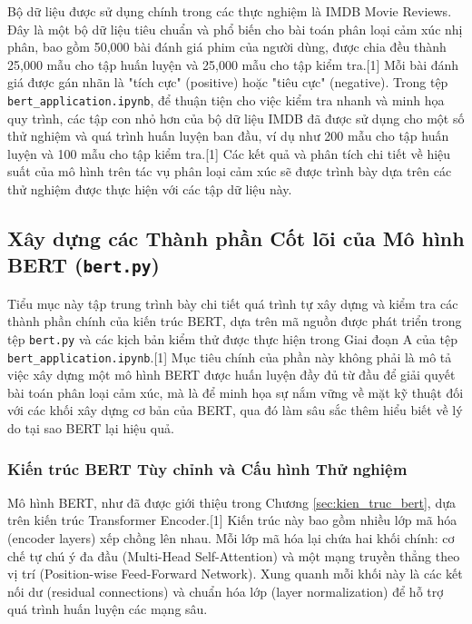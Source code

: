 Bộ dữ liệu được sử dụng chính trong các thực nghiệm là IMDB Movie Reviews. Đây là một bộ dữ liệu tiêu chuẩn và phổ biến cho bài toán phân loại cảm xúc nhị phân, bao gồm 50,000 bài đánh giá phim của người dùng, được chia đều thành 25,000 mẫu cho tập huấn luyện và 25,000 mẫu cho tập kiểm tra.[1] Mỗi bài đánh giá được gán nhãn là "tích cực" (positive) hoặc "tiêu cực" (negative). Trong tệp \texttt{bert\_application.ipynb}, để thuận tiện cho việc kiểm tra nhanh và minh họa quy trình, các tập con nhỏ hơn của bộ dữ liệu IMDB đã được sử dụng cho một số thử nghiệm và quá trình huấn luyện ban đầu, ví dụ như 200 mẫu cho tập huấn luyện và 100 mẫu cho tập kiểm tra.[1] Các kết quả và phân tích chi tiết về hiệu suất của mô hình trên tác vụ phân loại cảm xúc sẽ được trình bày dựa trên các thử nghiệm được thực hiện với các tập dữ liệu này.

\subsection{Xây dựng các Thành phần Cốt lõi của Mô hình BERT (\texttt{bert.py})}
\label{ssec:xay_dung_thanh_phan_cot_loi_rewrite}
Tiểu mục này tập trung trình bày chi tiết quá trình tự xây dựng và kiểm tra các thành phần chính của kiến trúc BERT, dựa trên mã nguồn được phát triển trong tệp \texttt{bert.py} và các kịch bản kiểm thử được thực hiện trong Giai đoạn A của tệp \texttt{bert\_application.ipynb}.[1] Mục tiêu chính của phần này không phải là mô tả việc xây dựng một mô hình BERT được huấn luyện đầy đủ từ đầu để giải quyết bài toán phân loại cảm xúc, mà là để minh họa sự nắm vững về mặt kỹ thuật đối với các khối xây dựng cơ bản của BERT, qua đó làm sâu sắc thêm hiểu biết về lý do tại sao BERT lại hiệu quả.

\subsubsection{Kiến trúc BERT Tùy chỉnh và Cấu hình Thử nghiệm}
\label{sssec:kien_truc_tuy_chinh_cau_hinh_thu_nghiem_rewrite}
Mô hình BERT, như đã được giới thiệu trong Chương \ref{sec:kien_truc_bert}, dựa trên kiến trúc Transformer Encoder.[1] Kiến trúc này bao gồm nhiều lớp mã hóa (encoder layers) xếp chồng lên nhau. Mỗi lớp mã hóa lại chứa hai khối chính: cơ chế tự chú ý đa đầu (Multi-Head Self-Attention) và một mạng truyền thẳng theo vị trí (Position-wise Feed-Forward Network). Xung quanh mỗi khối này là các kết nối dư (residual connections) và chuẩn hóa lớp (layer normalization) để hỗ trợ quá trình huấn luyện các mạng sâu.

